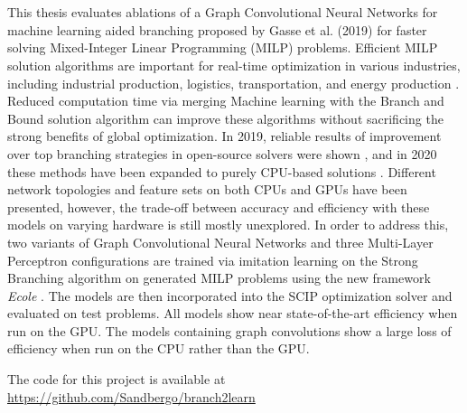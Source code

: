\chapter*{\englishabstractname}
%
This thesis evaluates ablations of a Graph Convolutional Neural Networks for machine learning aided branching proposed by Gasse et al. (2019) \cite{gasse2019exact}
for faster solving Mixed-Integer Linear Programming (\gls{MILP}) problems. 
Efficient \gls{MILP} solution algorithms are important for real-time optimization in various industries, including industrial production, logistics, transportation, and energy production \cite{junger2010years}.  Reduced computation time via merging Machine learning with the Branch and Bound solution algorithm can improve these algorithms without sacrificing the strong benefits of global optimization.
In 2019, reliable results of improvement over top branching strategies in open-source solvers were shown \cite{gasse2019exact}, and in 2020 these methods have been expanded to purely \gls{CPU}-based solutions \cite{gupta2020hybrid}. Different network topologies and feature sets on both \gls{CPU}s and \gls{GPU}s have been presented, however, the trade-off between accuracy and efficiency with these models on varying hardware is still mostly unexplored.
In order to address this, two variants of Graph Convolutional Neural Networks and three Multi-Layer Perceptron configurations are trained via imitation learning on the Strong Branching algorithm on generated \gls{MILP} problems using the new framework \textit{Ecole} \cite{prouvost2020ecole,prouvost2021ecole}.  The models are then incorporated into the \gls{SCIP} optimization solver and evaluated on test problems. All models show near state-of-the-art efficiency when run on the \gls{GPU}. The models containing graph convolutions show a large loss of efficiency when run on the \gls{CPU} rather than the \gls{GPU}.

The code for this project is available at\\ \url{https://github.com/Sandbergo/branch2learn}

%
\clearpage
